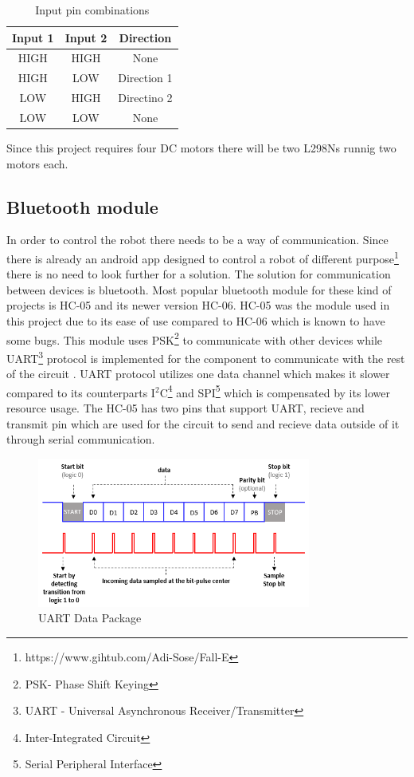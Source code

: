 \begin{table}[htbp]
    \caption{Input pin combinations}
    \begin{center}
        \begin{tabular}{|c|c|c|}
            \hline
            \textbf{Input 1} & \textbf{Input 2} & \textbf{Direction}\\
            \hline
            HIGH & HIGH & None\\
            \hline
            HIGH & LOW & Direction 1\\
            \hline
            LOW & HIGH & Directino 2\\
            \hline
            LOW & LOW & None\\
            \hline
        \end{tabular}
        \label{tab1}
    \end{center}
\end{table}

Since this project requires four DC motors there will be two L298Ns runnig two motors each.

\subsection{Bluetooth module}

In order to control the robot there needs to be a way of communication. Since there is already an android app designed to control a robot of different purpose\footnote{https://www.gihtub.com/Adi-Sose/Fall-E} there is no need to look further for a solution. The solution for communication between devices is bluetooth. Most popular bluetooth module for these kind of projects is HC-05 and its newer version HC-06. HC-05 was the module used in this project due to its ease of use compared to HC-06 which is known to have some bugs. This module uses PSK\footnote{PSK- Phase Shift Keying} to communicate with other devices while UART\footnote{UART - Universal Asynchronous Receiver/Transmitter} protocol is implemented for the component to communicate with the rest of the circuit \cite{HC-05}. UART protocol utilizes one data channel which makes it slower compared to its counterparts I$^2$C\footnote{Inter-Integrated Circuit} and SPI\footnote{Serial Peripheral Interface} which is compensated by its lower resource usage. The HC-05 has two pins that support UART, recieve and transmit pin which are used for the circuit to send and recieve data outside of it through serial communication. 

\begin{figure}[htbp]
    \centerline{\includegraphics[width=9cm]{Images/UART.png}}
    \caption{UART Data Package}
    \label{fig5}
\end{figure}

